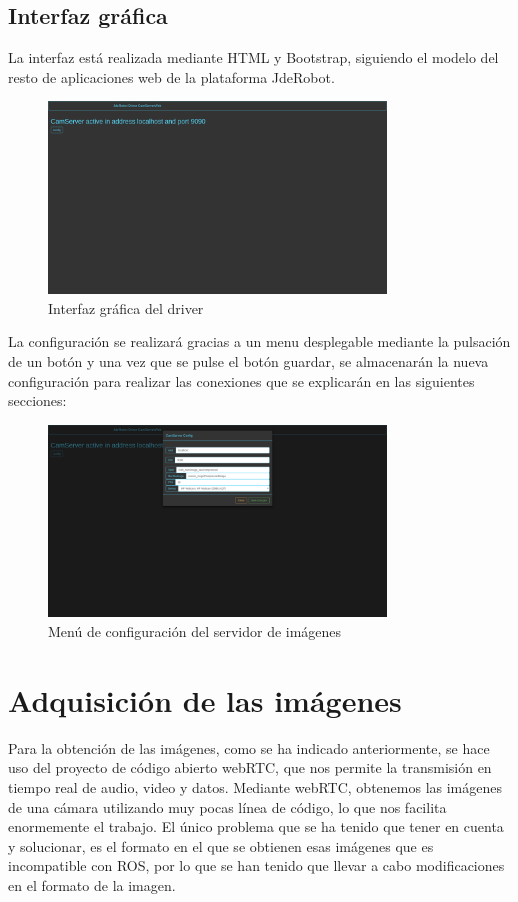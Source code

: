 \subsection{Interfaz gráfica}
La interfaz está realizada mediante HTML y Bootstrap, siguiendo el modelo del resto de aplicaciones web de la plataforma JdeRobot.
\begin{figure}[H]
  \begin{center}
    \includegraphics[width=0.8\textwidth]{figures/Interfazcamserver.png}
		\caption{Interfaz gráfica del driver}
		\label{fig.interfazcamserver}
		\end{center}
\end{figure}
La configuración se realizará gracias a un menu desplegable mediante la pulsación de un botón y una vez que se pulse el botón guardar, se almacenarán la nueva configuración para realizar las conexiones que se explicarán en las siguientes secciones:
 \begin{figure}[H]
  \begin{center}
    \includegraphics[width=0.8\textwidth]{figures/configcamserver.png}
		\caption{Menú de configuración del servidor de imágenes}
		\label{fig.configcamserver}
		\end{center}
\end{figure}

\section{Adquisición de las imágenes}
Para la obtención de las imágenes, como se ha indicado anteriormente, se hace uso del proyecto de código abierto webRTC, que nos permite la transmisión en tiempo real de audio, video y datos.
Mediante webRTC, obtenemos las imágenes de una cámara utilizando muy pocas línea de código, lo que nos facilita enormemente el trabajo. El único problema que se ha tenido que tener en cuenta y solucionar, es el formato en el que se obtienen esas imágenes que es incompatible con ROS, por lo que se han tenido que llevar a cabo modificaciones en el formato de la imagen.

